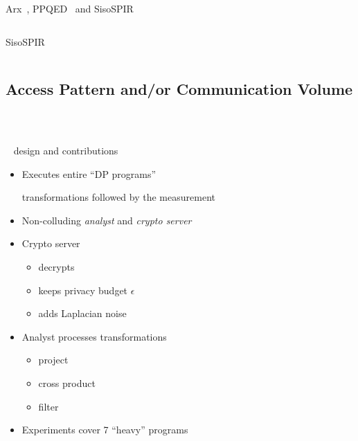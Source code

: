 \begin{frame}{Arx~\cite{arx}, PPQED~\cite{ppqed} and SisoSPIR~\cite{sisospir}}
\begin{columns}[T,onlytextwidth]
{\begin{block}{SisoSPIR~\cite{sisospir}}
						\end{block}

					}

			\end{columns}

		\end{frame}

	\subsection{Access Pattern and/or Communication Volume}

		\begin{frame}{\crypte~\cite{crypte}}

			\begin{columns}[T,onlytextwidth]

					\begin{block}{\crypte~\cite{crypte} design and contributions}

						\begin{itemize}
							\item Executes entire ``DP programs'' \\
								\begin{small}
									transformations followed by the measurement
								\end{small}
							\item Non-colluding \emph{analyst} and \emph{crypto server}
							\item Crypto server
								\begin{small}
									\begin{itemize}
										\item decrypts
										\item keeps privacy budget $\epsilon$
										\item adds Laplacian noise
									\end{itemize}
								\end{small}
							\item Analyst processes transformations
								\begin{small}
									\begin{itemize}
										\item project
										\item cross product
										\item filter
									\end{itemize}
								\end{small}
							\item Experiments cover 7 ``heavy'' programs
						\end{itemize}


\end{block}
\end{columns}
\end{frame}
